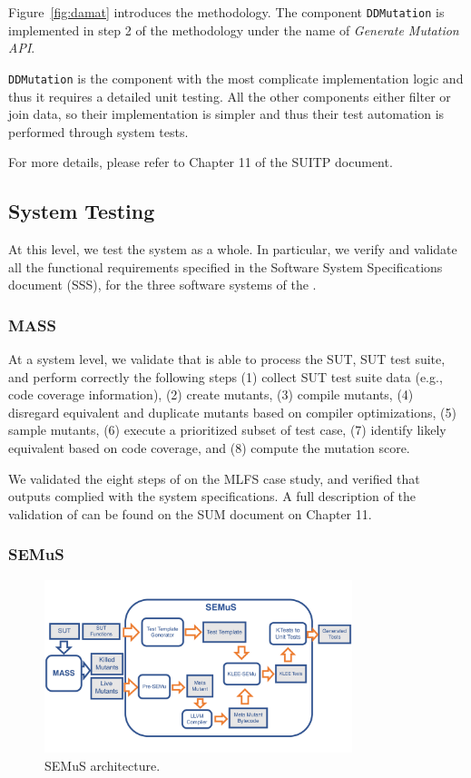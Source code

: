 Figure~\ref{fig:damat} introduces the \DAMA methodology. The component \texttt{DDMutation} is implemented in step 2 of the methodology under the name of \emph{Generate Mutation API}.

\texttt{DDMutation} is the component with the most complicate implementation logic and thus it requires a detailed unit testing. All the other components either filter or join data, so their implementation is simpler and thus their test automation is performed through system tests.

For more details, please refer to Chapter 11 of the SUITP document.

\subsection{System Testing}

At this level, we test the system as a whole. In particular, we verify and validate all the functional requirements specified in the Software System Specifications document (SSS), for the three software systems of the \FAQAS.

\subsubsection{MASS}

At a system level, we validate that \MASS is able to process the SUT, SUT test suite, and perform correctly the following steps (1) collect SUT test suite data (e.g., code coverage information), (2) create mutants, (3) compile mutants, (4) disregard equivalent and duplicate mutants based on compiler optimizations, (5) sample mutants, (6) execute a prioritized subset of test case, (7) identify likely equivalent based on code coverage, and (8) compute the mutation score.

We validated the eight steps of \MASS on the MLFS case study, and verified that outputs complied with the system specifications. A full description of the validation of \MASS can be found on the SUM document on Chapter 11.

\subsubsection{SEMuS}

\begin{figure}[t]
  \centering
  \includegraphics[width=0.8\textwidth]{images/semus-architecture.pdf}
      \caption{SEMuS architecture.}
      \label{fig:semus}
\end{figure}

